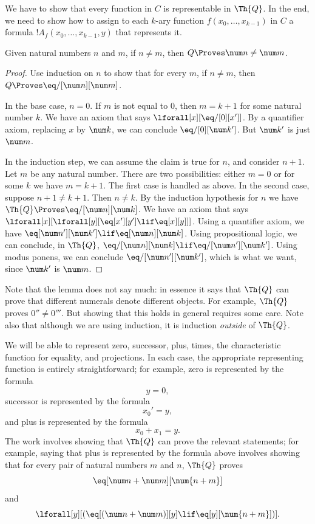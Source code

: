 \documentclass[../../../include/open-logic-section]{subfiles}
\begin{document}

We have to show that every function in $C$ is representable in
$\Th{Q}$. In the end, we need to show how to assign to each $k$-ary
function $f(x_0,\dots,x_{k-1})$ in $C$ a formula
$!A_f(x_0,\dots,x_{k-1},y)$ that represents it.

\begin{lem}
Given natural numbers $n$ and $m$, if $n \neq m$, then $Q \Proves \num
n \neq \num m$.
\end{lem}

\begin{proof}
Use induction on $n$ to show that for every $m$, if $n \neq m$, then
$Q \Proves \eq/[\num n][\num m]$.

In the base case, $n = 0$. If $m$ is not equal to $0$, then $m = k +
1$ for some natural number $k$. We have an axiom that says
$\lforall[x][\eq/[0][x']]$. By a quantifier axiom, replacing $x$ by
  $\num k$, we can conclude $\eq/[0][\num k']$. But $\num k'$ is just
  $\num m$.

In the induction step, we can assume the claim is true for $n$, and
consider $n+1$. Let $m$ be any natural number. There are two
possibilities: either $m = 0$ or for some $k$ we have $m = k+1$. The
first case is handled as above. In the second case, suppose $n+1 \neq
k+1$. Then $n \neq k$. By the induction hypothesis for $n$ we have
$\Th{Q} \Proves \eq/[\num n][\num k]$. We have an axiom that says
$\lforall[x][\lforall[y][\eq[x'][y'] \lif \eq[x][y]]]$. Using a
quantifier axiom, we have $\eq[\num n'][\num k'] \lif \eq[\num n][\num
  k]$. Using propositional logic, we can conclude, in $\Th{Q}$,
$\eq/[\num n][\num k] \lif \eq/[\num n'][\num k']$. Using modus
ponens, we can conclude $\eq/[\num n'][\num k']$, which is what we want,
since $\num k'$ is $\num m$.
\end{proof}

Note that the lemma does not say much: in essence it says that $\Th{Q}$ can
prove that different numerals denote different objects. For example,
$\Th{Q}$ proves $0'' \neq 0'''$. But showing that this holds in general
requires some care. Note also that although we are using induction, it
is induction \emph{outside} of $\Th{Q}$.

We will be able to represent zero, successor, plus, times, the
characteristic function for equality, and projections. In each case,
the appropriate representing function is entirely straightforward; for
example, zero is represented by the formula
\[
y = 0,
\]
successor is represented by the formula
\[
x_0' = y,
\]
and plus is represented by the formula
\[
x_0 + x_1 = y.
\]
The work involves showing that $\Th{Q}$ can prove the relevant statements;
for example, saying that plus is represented by the formula above
involves showing that for every pair of natural numbers $m$ and $n$,
$\Th{Q}$ proves
\[
\eq[\num n + \num m][\num {n+m}]
\]
and
\[
\lforall[y][(\eq[(\num n + \num m)][y] \lif \eq[y][\num {n+m}])].
\]
\end{document}

